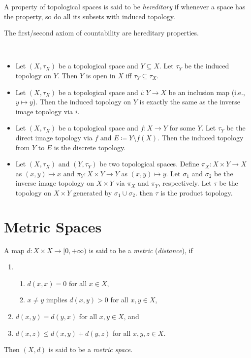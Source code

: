 \documentclass{techreport}
\begin{document}
\begin{definition}\label{De:HereditaryProperty}
	A property of topological spaces is said to be \emph{hereditary} if whenever a space has the property, so do all its subsets with induced topology.
\end{definition}

\begin{remark}\label{Rem:AxCountHereditary}
	The first/second axiom of countability are hereditary properties.
\end{remark}

\begin{remark}\label{Rem:SomeResultsAboutTopologies}\
	\begin{itemize}
		\item Let $(X,\tau_X)$ be a topological space and $Y \subseteq X$.
		Let $\tau_Y$ be the induced topology on $Y$.
		Then $Y$ is open in $X$ iff $\tau_Y \subseteq \tau_X$.
		\item Let $(X,\tau_X)$ be a topological space and $i : Y \to X$ be an inclusion map (i.e., $y \mapsto y$).
		Then the induced topology on $Y$ is exactly the same as the inverse image topology via $i$.
		\item Let $(X,\tau_X)$ be a topological space and $f : X\to Y$ for some $Y$.
		Let $\tau_Y$ be the direct image topology via $f$ and $E \coloneqq Y \setminus f(X)$.
		Then the induced topology from $Y$ to $E$ is the discrete topology.
		\item Let $(X,\tau_X)$ and $(Y,\tau_Y)$ be two topological spaces.
		Define $\pi_X : X \times Y \to X$ as $(x,y) \mapsto x$ and $\pi_Y : X \times Y \to Y$ as $(x,y) \mapsto y$.
		Let $\sigma_1$ and $\sigma_2$ be the inverse image topology on $X \times Y$ via $\pi_X$ and $\pi_Y$, respectively.
		Let $\tau$ be the topology on $X \times Y$ generated by $\sigma_1 \cup \sigma_2$.
		then $\tau$ is the product topology.
	\end{itemize}	
\end{remark}

\section{Metric Spaces}

\begin{definition}\label{De:Metrics}
	A map $d : X \times X \to [0,+\infty)$ is said to be a \emph{metric} (\emph{distance}), if
	\begin{enumerate}
		\item 
		\begin{enumerate}
			\item $d(x,x) = 0$ for all $x \in X$,
			\item $x \neq y$ implies $d(x,y) > 0$ for all $x,y \in X$,
		\end{enumerate}
		\item $d(x,y) = d(y,x)$ for all $x,y \in X$, and
		\item $d(x,z) \le d(x,y) + d(y,z)$ for all $x,y,z \in X$.
	\end{enumerate}
	Then $(X,d)$ is said to be a \emph{metric space}.
\end{definition}
\end{document}
